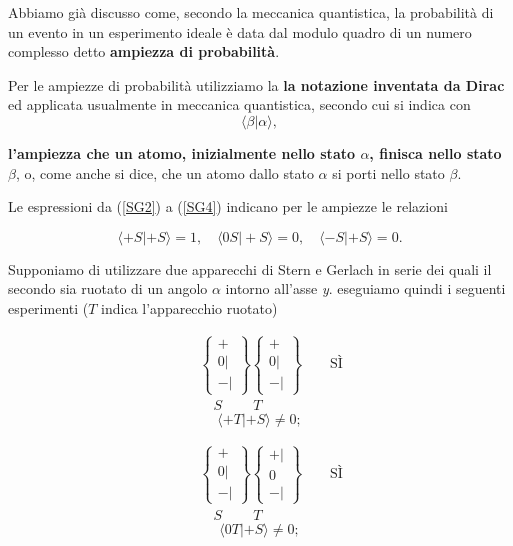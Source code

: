\documentclass[a4paper,12pt,oneside]{book}
\begin{document}
Abbiamo già discusso come, secondo la meccanica quantistica, la probabilità di un evento in un esperimento ideale è data dal modulo quadro di un numero complesso detto \textbf{ampiezza di probabilità}.

Per le ampiezze di probabilità utilizziamo la \textbf{la notazione inventata da Dirac} ed applicata usualmente in meccanica quantistica, secondo cui si indica con 
\begin{equation}
\langle\beta |\alpha \rangle ,
\end{equation} 

\textbf{l'ampiezza che un atomo, inizialmente nello stato $\alpha$, finisca nello stato $\beta$}, o, come anche si dice, che un atomo dallo stato $\alpha$ si porti nello stato $\beta$.

Le espressioni da (\ref{SG2}) a (\ref{SG4}) indicano per le ampiezze le relazioni

\begin{equation}
\langle +S |+S \rangle =1, \quad \langle 0S | +S \rangle =0, \quad \langle -S | +S \rangle=0 .
 \label{cap3_1}
\end{equation} 

Supponiamo di utilizzare due apparecchi di Stern e Gerlach in serie dei quali il secondo sia ruotato di un angolo $\alpha$ intorno all'asse \emph{y}. eseguiamo quindi i seguenti esperimenti ($T$ indica l'apparecchio ruotato)


\begin{eqnarray}
& &\begin{Bmatrix}
 + \\ 0 | \\ - |  
\end{Bmatrix}
\begin{Bmatrix}
 + \\ 0 | \\ - |  
\end{Bmatrix} \qquad \text{SÌ}  \\
& & \quad S  \ \qquad T
\label{SG5} \nonumber
\end{eqnarray}
\begin{equation}
\langle +T | +S \rangle \neq 0 ;
\end{equation} 


\begin{eqnarray}
& &\begin{Bmatrix}
 + \\ 0 | \\ - |  
\end{Bmatrix}
\begin{Bmatrix}
 + | \\ 0 \\ - |  
\end{Bmatrix} \qquad \text{SÌ} \\
& & \quad S  \ \qquad T \nonumber
\label{SG6}
\end{eqnarray}
\begin{equation}
\langle 0T | +S \rangle \neq 0 ;
\end{equation} 
\end{document}

